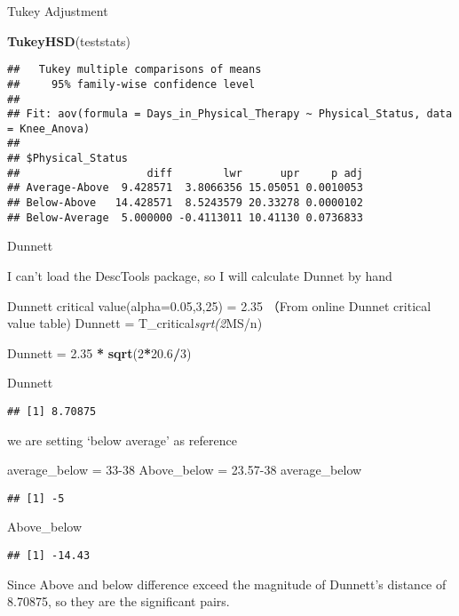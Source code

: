 \documentclass[]{article}
\newenvironment{Shaded}{\begin{snugshade}}{\end{snugshade}}
\newcommand{\DecValTok}[1]{\textcolor[rgb]{0.00,0.00,0.81}{#1}}
\newcommand{\FloatTok}[1]{\textcolor[rgb]{0.00,0.00,0.81}{#1}}
\newcommand{\KeywordTok}[1]{\textcolor[rgb]{0.13,0.29,0.53}{\textbf{#1}}}
\newcommand{\NormalTok}[1]{#1}
\newcommand{\OperatorTok}[1]{\textcolor[rgb]{0.81,0.36,0.00}{\textbf{#1}}}
\newcommand{\StringTok}[1]{\textcolor[rgb]{0.31,0.60,0.02}{#1}}
\begin{document}
Tukey Adjustment

\begin{Shaded}
\begin{Highlighting}[]
\KeywordTok{TukeyHSD}\NormalTok{(teststats)}
\end{Highlighting}
\end{Shaded}

\begin{verbatim}
##   Tukey multiple comparisons of means
##     95% family-wise confidence level
## 
## Fit: aov(formula = Days_in_Physical_Therapy ~ Physical_Status, data = Knee_Anova)
## 
## $Physical_Status
##                    diff        lwr      upr     p adj
## Average-Above  9.428571  3.8066356 15.05051 0.0010053
## Below-Above   14.428571  8.5243579 20.33278 0.0000102
## Below-Average  5.000000 -0.4113011 10.41130 0.0736833
\end{verbatim}

Dunnett

I can't load the DescTools package, so I will calculate Dunnet by hand

Dunnett critical value(alpha=0.05,3,25) = 2.35 （From online Dunnet
critical value table) Dunnett = T\_critical\emph{sqrt(2}MS/n)

\begin{Shaded}
\begin{Highlighting}[]
\NormalTok{Dunnett =}\StringTok{ }\FloatTok{2.35} \OperatorTok{*}\StringTok{ }\KeywordTok{sqrt}\NormalTok{(}\DecValTok{2}\OperatorTok{*}\FloatTok{20.6}\OperatorTok{/}\DecValTok{3}\NormalTok{) }

\NormalTok{Dunnett}
\end{Highlighting}
\end{Shaded}

\begin{verbatim}
## [1] 8.70875
\end{verbatim}

we are setting `below average' as reference

\begin{Shaded}
\begin{Highlighting}[]
\NormalTok{average_below =}\StringTok{ }\DecValTok{33-38}
\NormalTok{Above_below =}\StringTok{ }\FloatTok{23.57}\DecValTok{-38}
\NormalTok{average_below}
\end{Highlighting}
\end{Shaded}

\begin{verbatim}
## [1] -5
\end{verbatim}

\begin{Shaded}
\begin{Highlighting}[]
\NormalTok{Above_below}
\end{Highlighting}
\end{Shaded}

\begin{verbatim}
## [1] -14.43
\end{verbatim}

Since Above and below difference exceed the magnitude of Dunnett's
distance of 8.70875, so they are the significant pairs.
\end{document}

